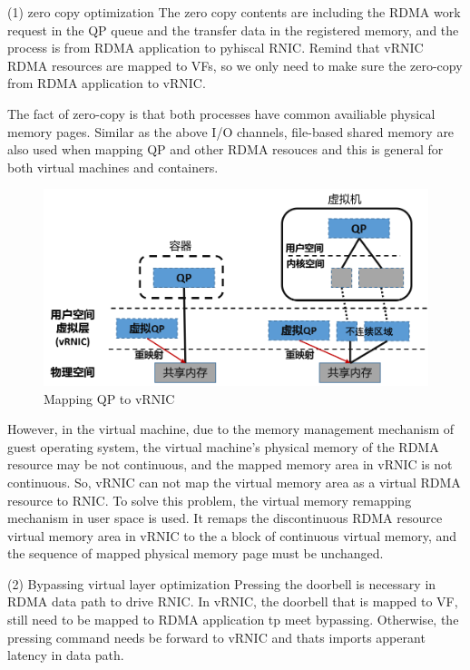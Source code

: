 (1) zero copy optimization
The zero copy contents are including the RDMA work request in the QP queue and the transfer data in the registered memory, and the process is from RDMA application to pyhiscal RNIC. Remind that vRNIC RDMA resources are mapped to VFs, so we only need to make sure the zero-copy from RDMA application to vRNIC.

The fact of zero-copy is that both processes have common availiable physical memory pages. Similar as the above I/O channels, file-based shared memory are also used when mapping QP and other RDMA resouces and this is general for both virtual machines and containers.

\begin{figure}[!ht]
	\centering
	\includegraphics[width=1.0\linewidth]{images/zero-copy}
	\caption{Mapping QP to vRNIC}
	\label{fig:zero-copy}
\end{figure}

However, in the virtual machine, due to the memory management mechanism of guest operating system, the virtual machine's physical memory of the RDMA resource may be not continuous, and the mapped memory area in vRNIC is not continuous. So, vRNIC can not map the virtual memory area as a virtual RDMA resource to RNIC. To solve this problem, the virtual memory remapping mechanism in user space is used. It remaps the discontinuous RDMA resource virtual memory area in vRNIC to the a block of continuous virtual memory, and the  sequence of mapped physical memory page must be unchanged.

(2) Bypassing virtual layer optimization
Pressing the doorbell is necessary in RDMA data path to drive RNIC. In vRNIC, the doorbell that is mapped to VF, still need to be mapped to RDMA application tp meet bypassing. Otherwise, the pressing command needs be forward to vRNIC and thats imports apperant latency in data path.

